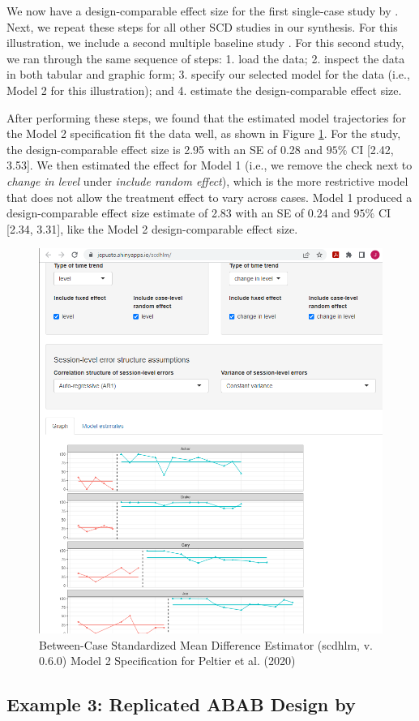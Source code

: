 \documentclass[
]{book}
\begin{document}
We now have a design-comparable effect size for the first single-case study by \citet{case1992Improving}. Next, we repeat these steps for all other SCD studies in our synthesis. For this illustration, we include a second multiple baseline study \citep{peltier2020Effects}. For this second study, we ran through the same sequence of steps:
1. load the data;
2. inspect the data in both tabular and graphic form;
3. specify our selected model for the data (i.e., Model 2 for this illustration); and
4. estimate the design-comparable effect size.

After performing these steps, we found that the estimated model trajectories for the Model 2 specification fit the \citet{peltier2020Effects} data well, as shown in Figure \ref{fig:Model2-Peltier-2020}. For the \citet{peltier2020Effects} study, the design-comparable effect size is 2.95 with an SE of 0.28 and \(95\%\) CI {[}2.42, 3.53{]}. We then estimated the effect for Model 1 (i.e., we remove the check next to \emph{change in level} under \emph{include random effect}), which is the more restrictive model that does not allow the treatment effect to vary across cases. Model 1 produced a design-comparable effect size estimate of 2.83 with an SE of 0.24 and \(95\%\) CI {[}2.34, 3.31{]}, like the Model 2 design-comparable effect size.

\begin{figure}
\includegraphics[width=0.5\linewidth,height=0.75\textheight]{images/app.model.model2_Peltier2020} \caption{Between-Case Standardized Mean Difference Estimator (scdhlm, v. 0.6.0) Model 2 Specification for Peltier et al. (2020)}\label{fig:Model2-Peltier-2020}
\end{figure}

\hypertarget{example-3-replicated-abab-design-by-lambert2006effects}{%
\subsection{\texorpdfstring{Example 3: Replicated ABAB Design by \citet{lambert2006effects}}{Example 3: Replicated ABAB Design by @lambert2006effects}}\label{example-3-replicated-abab-design-by-lambert2006effects}}
\end{document}
